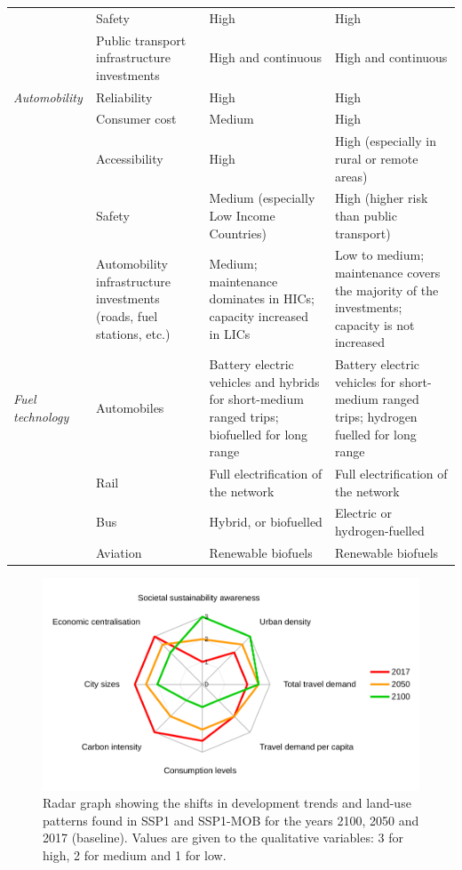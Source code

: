 \begin{landscape}
{\begin{longtable}{p{2.5cm}p{3.5cm}p{6cm}p{6cm}}
 & Safety & High & High \\*
 & Public transport infrastructure investments & High and continuous & High and continuous \\ \addlinespace
\textit{Automobility} & Reliability & High & High \\*
 & Consumer cost & Medium & High \\*
 & Accessibility & High & High (especially in rural or remote areas) \\*
 & Safety & Medium (especially Low Income Countries) & High (higher risk than public transport) \\*
 & Automobility infrastructure investments (roads, fuel stations, etc.) & Medium; maintenance dominates in HICs; capacity increased in LICs & Low to medium; maintenance covers the majority of the investments; capacity is not increased \\ \addlinespace
\textit{Fuel technology} & Automobiles & Battery electric vehicles and hybrids for short-medium ranged trips; biofuelled for long range & Battery electric vehicles for short-medium ranged trips; hydrogen fuelled for long range \\*
 & Rail & Full electrification of the network & Full electrification of the network \\*
 & Bus & Hybrid, or biofuelled & Electric or hydrogen-fuelled \\*
 & Aviation & Renewable biofuels & Renewable biofuels
\end{longtable}
}
\end{landscape}
%
\begin{figure}
\centering
\includegraphics[width=0.7\linewidth]{figures/radar_development-scenario}
\caption[Shifts in development and land-use patterns in SSP1-MOB.]{Radar graph showing the shifts in development trends and land-use patterns found in SSP1 and SSP1-MOB for the years 2100, 2050 and 2017 (baseline). Values are given to the qualitative variables: 3 for high, 2 for medium and 1 for low.}
\label{fig:results:radar_development-scenario}
\end{figure}

